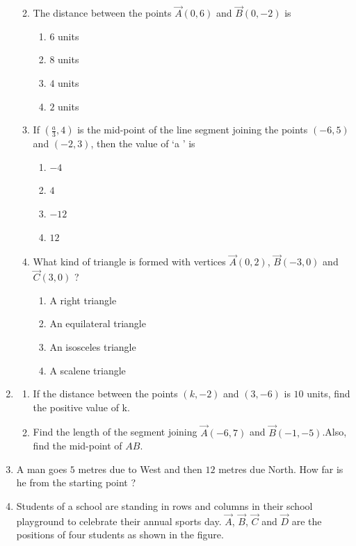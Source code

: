 \begin{enumerate}
\begin{enumerate}[label=(\roman*)]
\begin{enumerate}[label=(\Alph*)]
			     \end{enumerate}
		    \item The distance between the points $\vec{A}(0, 6)$ and $\vec{B}(0, -2)$ is 
			    \begin{enumerate}[label=(\Alph*)]
				    \item $6$ units
				    \item $8$ units
				    \item $4$ units
				    \item $2$ units
				    \end{enumerate}
		    \item If $(\frac{a}{3},4)$ is the mid-point of the line segment joining the points $(-6, 5)$ and $(-2, 3)$, then the value of \lq a \rq{} is
		    \begin{enumerate}[label=(\Alph*)]
				    \item $-4$
				    \item $4$
				    \item $-12$
				    \item $12$
			    \end{enumerate}
		    \item What kind of triangle is formed with vertices $\vec{A}(0, 2)$, $\vec{B}(-3, 0)$ and $\vec{C}(3, 0)$ ?
			    \begin{enumerate}[label=(\Alph*)]
				    \item A right triangle
				    \item An equilateral triangle
				    \item An isosceles triangle
				    \item A scalene triangle
			    \end{enumerate}
	     \end{enumerate}
     \item \begin{enumerate}[label=(\alph*)]
		     \item If the distance between the points $(k, -2)$ and $(3, -6)$ is $10$ units, find the positive value of k.
		     \item Find the length of the segment joining $\vec{A}(-6, 7)$ and $\vec{B}(-1, -5)$.Also, find the mid-point of $AB$. 
     \end{enumerate}
     \item A man goes $5$ metres due to West and then $12$ metres due North. How far is he from the starting point ?
     \item Students of a school are standing in rows and columns in their school playground to celebrate their annual sports day. $\vec{A}$, $\vec{B}$, $\vec{C}$ and $\vec{D}$ are the positions of four students as shown in the figure. \\

\end{enumerate}
